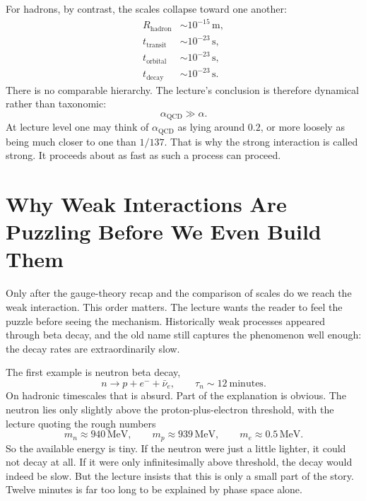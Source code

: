 For hadrons, by contrast, the scales collapse toward one another:
\begin{align}
R_{\text{hadron}} &\sim 10^{-15}\,\mathrm m,\\
t_{\text{transit}} &\sim 10^{-23}\,\mathrm s,\\
t_{\text{orbital}} &\sim 10^{-23}\,\mathrm s,\\
t_{\text{decay}} &\sim 10^{-23}\,\mathrm s.
\end{align}
There is no comparable hierarchy. The lecture's conclusion is therefore dynamical rather than taxonomic:
\begin{equation}
\alpha_{\mathrm{QCD}} \gg \alpha.
\end{equation}
At lecture level one may think of \(\alpha_{\mathrm{QCD}}\) as lying around \(0.2\), or more loosely as being much closer to one than \(1/137\). That is why the strong interaction is called strong. It proceeds about as fast as such a process can proceed.

\section{Why Weak Interactions Are Puzzling Before We Even Build Them}

Only after the gauge-theory recap and the comparison of scales do we reach the weak interaction. This order matters. The lecture wants the reader to feel the puzzle before seeing the mechanism. Historically weak processes appeared through beta decay, and the old name still captures the phenomenon well enough: the decay rates are extraordinarily slow.

The first example is neutron beta decay,
\begin{equation}
n\to p+e^-+\bar\nu_e,
\qquad
\tau_n\sim 12\ \text{minutes}.
\end{equation}
On hadronic timescales that is absurd. Part of the explanation is obvious. The neutron lies only slightly above the proton-plus-electron threshold, with the lecture quoting the rough numbers
\begin{equation}
m_n\approx 940\,\mathrm{MeV},
\qquad
m_p\approx 939\,\mathrm{MeV},
\qquad
m_e\approx 0.5\,\mathrm{MeV}.
\end{equation}
So the available energy is tiny. If the neutron were just a little lighter, it could not decay at all. If it were only infinitesimally above threshold, the decay would indeed be slow. But the lecture insists that this is only a small part of the story. Twelve minutes is far too long to be explained by phase space alone.

